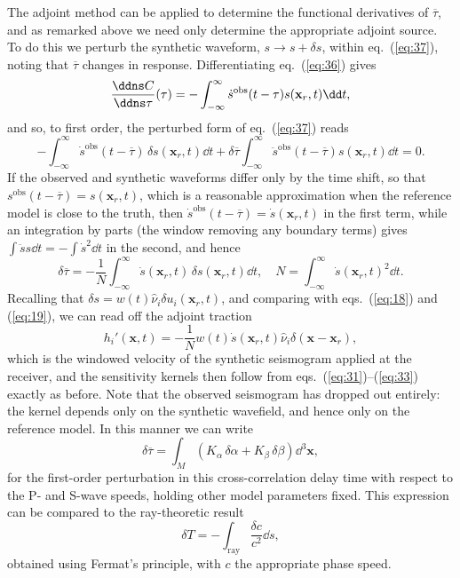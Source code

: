  The adjoint method can be applied to determine the functional derivatives of $\overline{\tau}$, and 
 as remarked above we need only determine the appropriate adjoint source. To do this we perturb the synthetic waveform, 
 $s\to s+\delta s$, within eq.~(\ref{eq:37}), noting that $\overline{\tau}$ changes in response. Differentiating 
 eq.~(\ref{eq:36}) gives
\begin{equation}
\frac{\ddns C}{\ddns\tau}(\tau)=-\int_{-\infty}^{\infty}\dot{s}^{\mathrm{obs}}(t-\tau)s(\mathbf{x}_{r},t)\dd t,
\label{eq:38}
\end{equation}
and so, to first order, the perturbed form of eq.~(\ref{eq:37}) reads
\begin{equation}
-\int_{-\infty}^{\infty}\dot{s}^{\mathrm{obs}}(t-\overline{\tau})\,\delta s(\mathbf{x}_{r},t)\dd t
+\delta\overline{\tau}\int_{-\infty}^{\infty}\ddot{s}^{\mathrm{obs}}(t-\overline{\tau})s(\mathbf{x}_{r},t)\dd t=0.
\label{eq:39}
\end{equation}
If the observed and synthetic waveforms differ only by the time shift, so that $s^{\mathrm{obs}}(t-\overline{\tau})=s(\mathbf{x}_{r},t)$, 
which is a reasonable approximation when the reference model is close to the truth, then
$\dot{s}^{\mathrm{obs}}(t-\overline{\tau})=\dot{s}(\mathbf{x}_{r},t)$ in the first term, while an integration by parts (the
window removing any boundary terms) gives $\int\ddot{s}s\dd t=-\int\dot{s}^{2}\dd t$ in the second, and hence
\begin{equation}
\delta\overline{\tau}=-\frac{1}{N}\int_{-\infty}^{\infty}\dot{s}(\mathbf{x}_{r},t)\,\delta s(\mathbf{x}_{r},t)\dd t,
\quad N=\int_{-\infty}^{\infty}\dot{s}(\mathbf{x}_{r},t)^{2}\dd t.
\label{eq:40}
\end{equation}
Recalling that $\delta s=w(t)\hat{\nu}_{i}\delta u_{i}(\mathbf{x}_{r},t)$, and comparing with eqs.~(\ref{eq:18}) and (\ref{eq:19}), 
we can read off the adjoint traction
\begin{equation}
h_{i}'(\mathbf{x},t)=-\frac{1}{N}w(t)\dot{s}(\mathbf{x}_{r},t)\hat{\nu}_{i}\delta(\mathbf{x}-\mathbf{x}_{r}),
\label{eq:41}
\end{equation}
which is the windowed velocity of the synthetic seismogram applied at the receiver, and the sensitivity kernels then follow 
from eqs.~(\ref{eq:31})--(\ref{eq:33}) exactly as before. Note that the observed seismogram has dropped out entirely: 
the kernel depends only on the synthetic wavefield, and hence only on the reference model. In this manner we can write
\begin{equation}
\delta\overline{\tau}=\int_{M}(K_{\alpha}\,\delta\alpha+K_{\beta}\,\delta\beta)\dd^{3}\mathbf{x},
\label{eq:42}
\end{equation}
for the first-order perturbation in this cross-correlation delay time with respect to the P- and S-wave speeds, 
holding other model parameters fixed. This expression can be compared to the ray-theoretic result
\begin{equation}
\delta T=-\int_{\mathrm{ray}}\frac{\delta c}{c^{2}}\dd s,
\label{eq:43}
\end{equation}
obtained using Fermat's principle, with $c$ the appropriate phase speed. 



